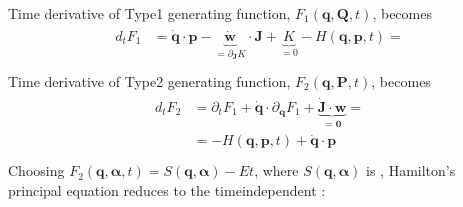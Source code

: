 \documentclass[letterpaper,10pt,english]{jupyterBook}
\begin{document}
\sphinxAtStartPar
Time derivative of Type\sphinxhyphen{}1 generating function, \(F_1(\mathbf{q},\mathbf{Q},t)\), becomes
\begin{equation*}
\begin{split}\begin{aligned}
  d_t F_1 
  & = \dot{\mathbf{q}} \cdot \mathbf{p} - \underbrace{ \dot{\mathbf{w}} }_{=\partial_{\mathbf{J}} K} \cdot \mathbf{J} + \underbrace{ K }_{=0} - H(\mathbf{q}, \mathbf{p}, t) = \\
\end{aligned}\end{split}
\end{equation*}
\sphinxAtStartPar
Time derivative of Type\sphinxhyphen{}2 generating function, \(F_2(\mathbf{q},\mathbf{P},t)\), becomes
\begin{equation*}
\begin{split}\begin{aligned}
  d_t F_2 
  & = \partial_t F_1 + \dot{\mathbf{q}} \cdot \partial_{\mathbf{q}} F_1 + \underbrace{\dot{\mathbf{J}} \cdot \mathbf{w}}_{=\mathbf{0}} = \\
  & = - H(\mathbf{q}, \mathbf{p}, t) + \dot{\mathbf{q}} \cdot \mathbf{p} \\
\end{aligned}\end{split}
\end{equation*}
\sphinxAtStartPar
Choosing \(F_2(\mathbf{q}, \boldsymbol{\alpha}, t) = S(\mathbf{q}, \boldsymbol{\alpha}) - E t\), where \(S(\mathbf{q}, \boldsymbol{\alpha})\) is , Hamilton’s principal equation reduces to the time\sphinxhyphen{}independent :
\end{document}
